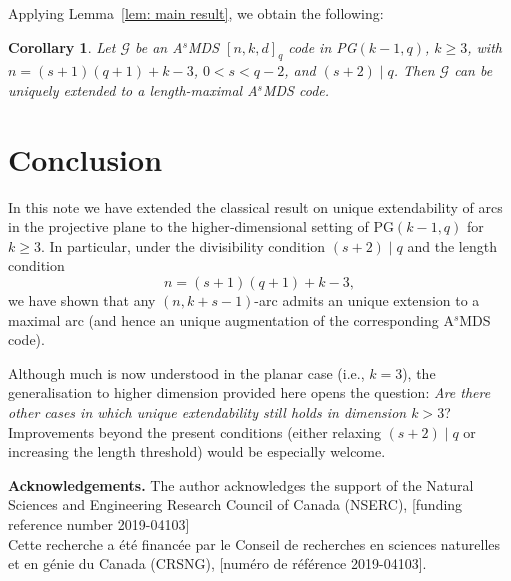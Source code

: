 \documentclass[letterpaper, 12pt]{article}
\newtheorem{corollary}{Corollary}
\newcommand{\G}{\mathcal{G}}
\begin{document}

Applying Lemma~\ref{lem: main result}, we obtain the following:

\begin{corollary}
	Let \( \G \) be an A$^s$MDS \([n, k, d]_q\) code in PG\((k - 1, q)\), $k\ge 3$, with \( n = (s+1)(q+1) + k - 3 \), \( 0 < s < q - 2 \), and \( (s+2) \mid q \). Then \( \G \) can be uniquely extended to a length-maximal A$^s$MDS code.
\end{corollary}



\section*{Conclusion}

In this note we have extended the classical result on unique extendability of arcs in the projective plane to the higher‐dimensional setting of \(\mathrm{PG}(k-1,q)\) for \(k\ge3\).  In particular, under the divisibility condition \((s+2)\mid q\) and the length condition 
\[
n = (s+1)(q+1) + k - 3,
\]
we have shown that any \((n, k + s - 1)\)-arc admits an  unique  extension to a maximal arc (and hence an unique augmentation of the corresponding A\(^s\)MDS code).  

Although much is now understood in the planar case (i.e., \(k=3\)), the generalisation to higher dimension provided here opens the question:\textit{ Are there  other  cases in which unique extendability still holds in dimension \(k>3\)}?  
Improvements beyond the present conditions (either relaxing \( (s+2)\mid q \) or increasing the length threshold) would be especially welcome.


\medskip  
\textbf{Acknowledgements.}   The author acknowledges the support of the Natural Sciences and Engineering Research Council of Canada (NSERC), [funding reference number 2019-04103]\\
Cette recherche a \'{e}t\'{e} financ\'{e}e par le Conseil de recherches en sciences naturelles et en g\'{e}nie du Canada (CRSNG), [numéro de r\'{e}f\'{e}rence 2019-04103]. 







 
\end{document}

